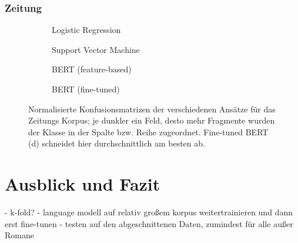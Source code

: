 \subsection{Zeitung}
\begin{figure}
\centering
\begin{subfigure}[b]{.45\linewidth}

\caption{Logistic Regression}\label{fig:zeitung-log}
\end{subfigure}
\begin{subfigure}[b]{.45\linewidth}

\caption{Support Vector Machine}\label{fig:zeitung-svm}
\end{subfigure}

\begin{subfigure}[b]{.45\linewidth}

\caption{BERT (feature-based)}\label{fig:zeitung-feat}
\end{subfigure}
\begin{subfigure}[b]{.45\linewidth}

\caption{BERT (fine-tuned)}\label{fig:zeitung-fine}
\end{subfigure}
\caption{Normalisierte Konfusionsmatrizen der verschiedenen Ansätze für das Zeitungs Korpus; je dunkler ein Feld, desto mehr Fragmente wurden der Klasse in der Spalte bzw. Reihe zugeordnet. Fine-tuned BERT (d) schneidet hier durchschnittlich am besten ab.}
\label{fig:roman}
\end{figure}





\chapter{Ausblick und Fazit}
\label{fazit}
- k-fold?
- language modell auf relativ großem korpus weitertrainieren und dann erst fine-tunen
- testen auf den abgeschnittenen Daten, zumindest für alle außer Romane


\nocite{*}

